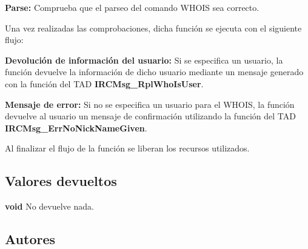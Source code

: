 \begin{DoxyItemize}
\item {\bfseries Parse\+:} Comprueba que el parseo del comando W\+H\+O\+I\+S sea correcto. 
\end{DoxyItemize}

Una vez realizadas las comprobaciones, dicha función se ejecuta con el siguiente flujo\+:


\begin{DoxyItemize}
\item {\bfseries Devolución de información del usuario\+:} Si se especifica un usuario, la función devuelve la información de dicho usuario mediante un mensaje generado con la función del T\+A\+D {\bfseries I\+R\+C\+Msg\+\_\+\+Rpl\+Who\+Is\+User}.  
\item {\bfseries Mensaje de error\+:} Si no se especifica un usuario para el W\+H\+O\+I\+S, la función devuelve al usuario un mensaje de confirmación utilizando la función del T\+A\+D {\bfseries I\+R\+C\+Msg\+\_\+\+Err\+No\+Nick\+Name\+Given}.  
\end{DoxyItemize}

Al finalizar el flujo de la función se liberan los recursos utilizados.\hypertarget{server_command_whois_return_whois}{}\subsection{Valores devueltos}\label{server_command_whois_return_whois}

\begin{DoxyItemize}
\item {\bfseries void} No devuelve nada. 
\end{DoxyItemize}\hypertarget{server_command_whois_authors_whois}{}\subsection{Autores}\label{server_command_whois_authors_whois}

